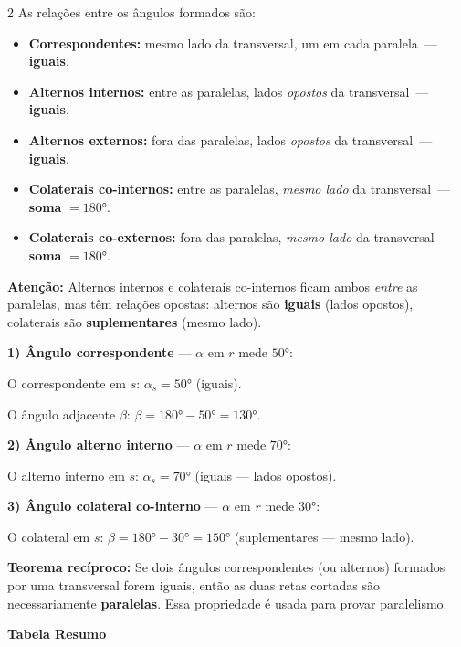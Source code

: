 \documentclass[12pt]{article}
\begin{document}
\begin{multicols}{2}
As relações entre os ângulos formados são:

\begin{itemize}
    \item \textbf{Correspondentes:} mesmo lado da transversal, um em cada paralela~--- \textbf{iguais}.
    \item \textbf{Alternos internos:} entre as paralelas, lados \textit{opostos} da transversal~--- \textbf{iguais}.
    \item \textbf{Alternos externos:} fora das paralelas, lados \textit{opostos} da transversal~--- \textbf{iguais}.
    \item \textbf{Colaterais co-internos:} entre as paralelas, \textit{mesmo lado} da transversal~--- \textbf{soma} $= \ang{180}$.
    \item \textbf{Colaterais co-externos:} fora das paralelas, \textit{mesmo lado} da transversal~--- \textbf{soma} $= \ang{180}$.
\end{itemize}

\textbf{Atenção:} Alternos internos e colaterais co-internos ficam ambos \textit{entre} as paralelas, mas têm relações opostas: alternos são \textbf{iguais} (lados opostos), colaterais são \textbf{suplementares} (mesmo lado).


\textbf{1) Ângulo correspondente} --- $\alpha$ em $r$ mede $\ang{50}$:

O correspondente em $s$: $\alpha_s = \ang{50}$ (iguais).

O ângulo adjacente $\beta$: $\beta = \ang{180} - \ang{50} = \ang{130}$.

\textbf{2) Ângulo alterno interno} --- $\alpha$ em $r$ mede $\ang{70}$:

O alterno interno em $s$: $\alpha_s = \ang{70}$ (iguais --- lados opostos).

\textbf{3) Ângulo colateral co-interno} --- $\alpha$ em $r$ mede $\ang{30}$:

O colateral em $s$: $\beta = \ang{180} - \ang{30} = \ang{150}$ (suplementares --- mesmo lado).

\textbf{Teorema recíproco:} Se dois ângulos correspondentes (ou alternos) formados por uma transversal forem iguais, então as duas retas cortadas são necessariamente \textbf{paralelas}. Essa propriedade é usada para provar paralelismo.

\end{multicols}

\begin{center}
    \textbf{\large \textcolor{bluebell}{Tabela Resumo}}
\end{center}
\end{document}
